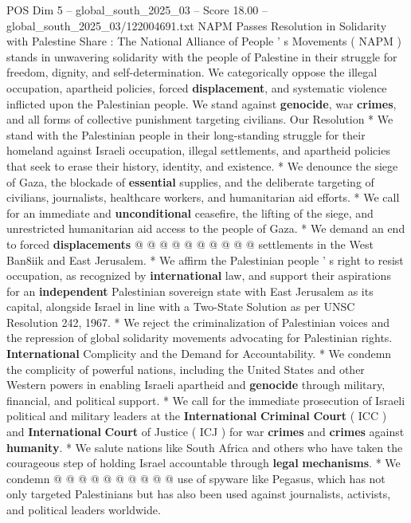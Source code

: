\begin{textsample}{POS Dim 5 – global\_south\_2025\_03 – Score 18.00 – global\_south\_2025\_03/122004691.txt}  \label{ex:f5_pos_182}
NAPM Passes Resolution in Solidarity with Palestine Share : The National Alliance of People ' s Movements ( NAPM ) stands in unwavering solidarity with the people of Palestine in their struggle for freedom, dignity, and self-determination.
We categorically oppose the illegal occupation, apartheid policies, forced \textbf{displacement}, and systematic violence inflicted upon the Palestinian people.
We stand against \textbf{genocide}, war \textbf{crimes}, and all forms of collective punishment targeting civilians.
Our Resolution * We stand with the Palestinian people in their long-standing struggle for their homeland against Israeli occupation, illegal settlements, and apartheid policies that seek to erase their history, identity, and existence. * We denounce the siege of Gaza, the blockade of \textbf{essential} supplies, and the deliberate targeting of civilians, journalists, healthcare workers, and humanitarian aid efforts. * We call for an immediate and \textbf{unconditional} ceasefire, the lifting of the siege, and unrestricted humanitarian aid access to the people of Gaza. * We demand an end to forced \textbf{displacements} @ @ @ @ @ @ @ @ @ @ settlements in the West Ban8iik and East Jerusalem. * We affirm the Palestinian people ' s right to resist occupation, as recognized by \textbf{international} law, and support their aspirations for an \textbf{independent} Palestinian sovereign state with East Jerusalem as its capital, alongside Israel in line with a Two-State Solution as per UNSC Resolution 242, 1967. * We reject the criminalization of Palestinian voices and the repression of global solidarity movements advocating for Palestinian rights. \textbf{International} Complicity and the Demand for Accountability. * We condemn the complicity of powerful nations, including the United States and other Western powers in enabling Israeli apartheid and \textbf{genocide} through military, financial, and political support. * We call for the immediate prosecution of Israeli political and military leaders at the \textbf{International} \textbf{Criminal} \textbf{Court} ( ICC ) and \textbf{International} \textbf{Court} of Justice ( ICJ ) for war \textbf{crimes} and \textbf{crimes} against \textbf{humanity}. * We salute nations like South Africa and others who have taken the courageous step of holding Israel accountable through \textbf{legal} \textbf{mechanisms}. * We condemn @ @ @ @ @ @ @ @ @ @ use of spyware like Pegasus, which has not only targeted Palestinians but has also been used against journalists, activists, and political leaders worldwide.

\end{textsample}
